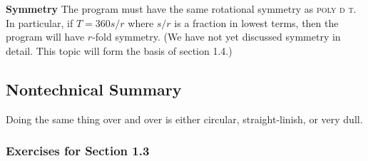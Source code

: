 \documentclass{book}
\begin{document}
\noindent \textbf{Symmetry} The program must have the same rotational symmetry as
\textsc{poly d t}. In particular, if $T = 360s/r$ where $s/r$ is a fraction in lowest
terms, then the program will have $r$-fold symmetry. (We have not yet
discussed symmetry in detail. This topic will form the basis of section 1.4.)

\subsection{Nontechnical Summary}

Doing the same thing over and over is either circular, straight-linish, or
very dull.

\subsubsection{Exercises for Section 1.3}
\end{document}
